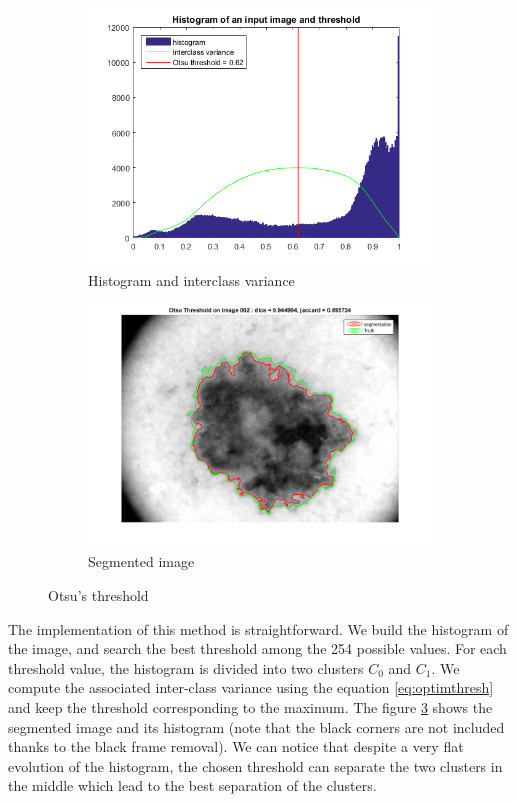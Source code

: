 \documentclass[a4paper,10pt]{article}
\begin{document}
\begin{figure}[h]
	\begin{subfigure}{0.49\linewidth}			
		\includegraphics[width=0.99\linewidth]{../results/otsu/histogram-thresh-sigma-002}	
		\caption{Histogram and interclass variance}
		\label{fig:otsu-hist}
	\end{subfigure}
	\begin{subfigure}{0.49\linewidth}			
		\includegraphics[width=0.99\linewidth]{../results/otsu/otsu-segt-im-002}	  
		\caption{Segmented image}
		\label{fig:otsu-segt-hist}
	\end{subfigure}
	\caption{Otsu's threshold}
	\label{fig:otsu-histogram}
\end{figure}

The implementation of this method is straightforward. We build the histogram of the image, and search the best threshold among the 254 possible values. For each threshold value, the histogram is divided into two clusters $C_0$ and $C_1$. We compute the associated inter-class variance using the equation \ref{eq:optimthresh} and keep the threshold corresponding to the maximum. The figure \ref{fig:otsu-histogram} shows the segmented image and its histogram (note that the black corners are not included thanks to the black frame removal). We can notice that despite a very flat evolution of the histogram, the chosen threshold can separate the two clusters in the middle which lead to the best separation of the clusters. 
\end{document}

